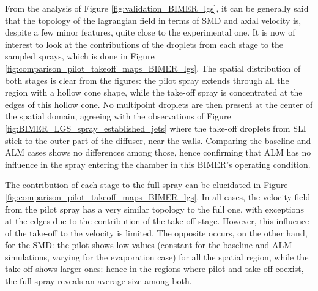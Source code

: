 From the analysis of Figure \ref{fig:validation_BIMER_lgs}, it can be generally said that the topology of the lagrangian field in terms of SMD and axial velocity is, despite a few minor features, quite close to the experimental one. It is now of interest to look at the contributions of the droplets from each stage to the sampled sprays, which is done in Figure \ref{fig:comparison_pilot_takeoff_maps_BIMER_lgs}. The spatial distribution of both stages is clear from the figures: the pilot spray extends through all the region with a hollow cone shape, while the take-off spray is concentrated at the edges of this hollow cone. No multipoint droplets are then present at the center of the spatial domain, agreeing with the observations of Figure \ref{fig:BIMER_LGS_spray_established_jets} where the take-off droplets from SLI stick to the outer part of the diffuser, near the walls. Comparing the baseline and ALM cases shows no differences among those, hence confirming that ALM has no influence in the spray entering the chamber in this BIMER's operating condition. 

The contribution of each stage to the full spray can be elucidated in Figure \ref{fig:comparison_pilot_takeoff_maps_BIMER_lgs}. In all cases, the velocity field from the pilot spray has a very similar topology to the full one, with exceptions at the edges due to the contribution of the take-off stage. However, this influence of the take-off to the velocity is limited. The opposite occurs, on the other hand, for the SMD: the pilot shows low values (constant for the baseline and ALM simulations, varying for the evaporation case) for all the spatial region, while the take-off shows larger ones: hence in the regions where pilot and take-off coexist, the full spray reveals an average size among both. %



